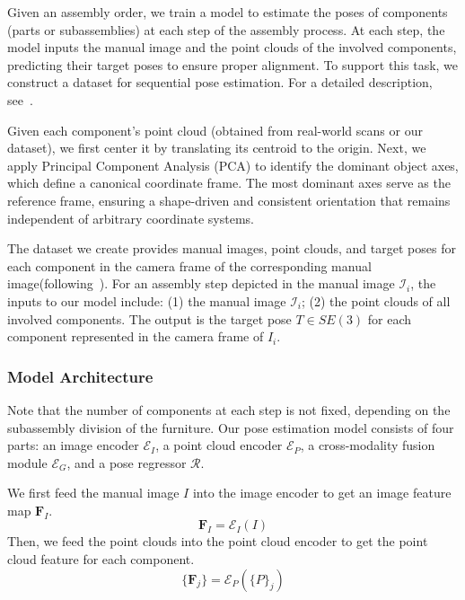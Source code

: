 Given an assembly order, we train a model to estimate the poses of components (parts or subassemblies) at each step of the assembly process. At each step, the model inputs the manual image and the point clouds of the involved components, predicting their target poses to ensure proper alignment. To support this task, we construct a dataset for sequential pose estimation. For a detailed description, see~.

Given each component's point cloud (obtained from real-world scans or our dataset), we first center it by translating its centroid to the origin. Next, we apply Principal Component Analysis (PCA) to identify the dominant object axes, which define a canonical coordinate frame. The most dominant axes serve as the reference frame, ensuring a shape-driven and consistent orientation that remains independent of arbitrary coordinate systems.

The dataset we create provides manual images, point clouds, and target poses for each component in the camera frame of the corresponding manual image(following~\cite{li2020learning}). For an assembly step depicted in the manual image $\mathcal{I}_i$, the inputs to our model include: (1) the manual image $\mathcal{I}_i$; (2) the point clouds of all involved components. The output is the target pose $T\in SE(3)$ for each component represented in the camera frame of $I_i$. 

\subsubsection{Model Architecture} Note that the number of components at each step is not fixed, depending on the subassembly division of the furniture.
Our pose estimation model consists of four parts: an image encoder $\mathcal{E}_I$, a point cloud encoder $\mathcal{E}_P$, a cross-modality fusion module $\mathcal{E}_G$, and a pose regressor $\mathcal{R}$.

We first feed the manual image $I$ into the image encoder to get an image feature map $\mathbf{F}_I$.
\begin{equation}
    \mathbf{F}_I = \mathcal{E}_I(I)
\end{equation}
Then, we feed the point clouds into the point cloud encoder to get the point cloud feature for each component. 
\begin{equation}
    \{\mathbf{F}_j\} = \mathcal{E}_P(\{P\}_j)
\end{equation}

